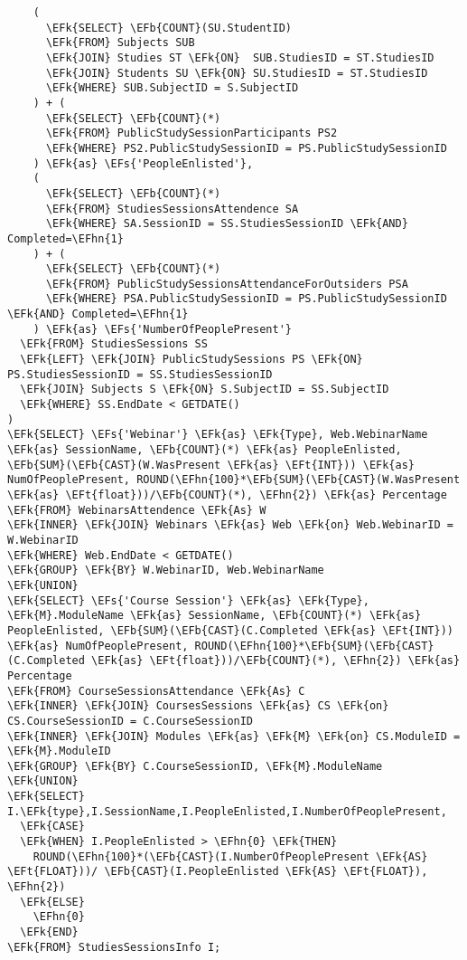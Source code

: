 \documentclass[11pt]{article}
\newcommand{\EFs}[1]{\textcolor{EFs}{#1}} %
\newcommand{\EFk}[1]{\textcolor{EFk}{\textbf{#1}}} %
\newcommand{\EFb}[1]{\textcolor{EFb}{\textbf{#1}}} %
\newcommand{\EFt}[1]{\textcolor{EFt}{\textbf{#1}}} %
\newcommand{\EFhn}[1]{\textcolor{EFhn}{#1}} %
\begin{document}
\begin{Code}
\begin{Verbatim}
    (
      \EFk{SELECT} \EFb{COUNT}(SU.StudentID)
      \EFk{FROM} Subjects SUB
      \EFk{JOIN} Studies ST \EFk{ON}  SUB.StudiesID = ST.StudiesID
      \EFk{JOIN} Students SU \EFk{ON} SU.StudiesID = ST.StudiesID
      \EFk{WHERE} SUB.SubjectID = S.SubjectID
    ) + (
      \EFk{SELECT} \EFb{COUNT}(*)
      \EFk{FROM} PublicStudySessionParticipants PS2
      \EFk{WHERE} PS2.PublicStudySessionID = PS.PublicStudySessionID
    ) \EFk{as} \EFs{'PeopleEnlisted'}, 
    (
      \EFk{SELECT} \EFb{COUNT}(*)
      \EFk{FROM} StudiesSessionsAttendence SA
      \EFk{WHERE} SA.SessionID = SS.StudiesSessionID \EFk{AND} Completed=\EFhn{1}
    ) + (
      \EFk{SELECT} \EFb{COUNT}(*)
      \EFk{FROM} PublicStudySessionsAttendanceForOutsiders PSA
      \EFk{WHERE} PSA.PublicStudySessionID = PS.PublicStudySessionID \EFk{AND} Completed=\EFhn{1}
    ) \EFk{as} \EFs{'NumberOfPeoplePresent'}
  \EFk{FROM} StudiesSessions SS 
  \EFk{LEFT} \EFk{JOIN} PublicStudySessions PS \EFk{ON} PS.StudiesSessionID = SS.StudiesSessionID
  \EFk{JOIN} Subjects S \EFk{ON} S.SubjectID = SS.SubjectID
  \EFk{WHERE} SS.EndDate < GETDATE()
)
\EFk{SELECT} \EFs{'Webinar'} \EFk{as} \EFk{Type}, Web.WebinarName \EFk{as} SessionName, \EFb{COUNT}(*) \EFk{as} PeopleEnlisted, \EFb{SUM}(\EFb{CAST}(W.WasPresent \EFk{as} \EFt{INT})) \EFk{as} NumOfPeoplePresent, ROUND(\EFhn{100}*\EFb{SUM}(\EFb{CAST}(W.WasPresent \EFk{as} \EFt{float}))/\EFb{COUNT}(*), \EFhn{2}) \EFk{as} Percentage
\EFk{FROM} WebinarsAttendence \EFk{As} W
\EFk{INNER} \EFk{JOIN} Webinars \EFk{as} Web \EFk{on} Web.WebinarID = W.WebinarID
\EFk{WHERE} Web.EndDate < GETDATE()
\EFk{GROUP} \EFk{BY} W.WebinarID, Web.WebinarName
\EFk{UNION}
\EFk{SELECT} \EFs{'Course Session'} \EFk{as} \EFk{Type}, \EFk{M}.ModuleName \EFk{as} SessionName, \EFb{COUNT}(*) \EFk{as} PeopleEnlisted, \EFb{SUM}(\EFb{CAST}(C.Completed \EFk{as} \EFt{INT})) \EFk{as} NumOfPeoplePresent, ROUND(\EFhn{100}*\EFb{SUM}(\EFb{CAST}(C.Completed \EFk{as} \EFt{float}))/\EFb{COUNT}(*), \EFhn{2}) \EFk{as} Percentage
\EFk{FROM} CourseSessionsAttendance \EFk{As} C
\EFk{INNER} \EFk{JOIN} CoursesSessions \EFk{as} CS \EFk{on} CS.CourseSessionID = C.CourseSessionID
\EFk{INNER} \EFk{JOIN} Modules \EFk{as} \EFk{M} \EFk{on} CS.ModuleID = \EFk{M}.ModuleID
\EFk{GROUP} \EFk{BY} C.CourseSessionID, \EFk{M}.ModuleName
\EFk{UNION}
\EFk{SELECT} I.\EFk{type},I.SessionName,I.PeopleEnlisted,I.NumberOfPeoplePresent,
  \EFk{CASE} 
  \EFk{WHEN} I.PeopleEnlisted > \EFhn{0} \EFk{THEN}
    ROUND(\EFhn{100}*(\EFb{CAST}(I.NumberOfPeoplePresent \EFk{AS} \EFt{FLOAT}))/ \EFb{CAST}(I.PeopleEnlisted \EFk{AS} \EFt{FLOAT}), \EFhn{2})
  \EFk{ELSE} 
    \EFhn{0}
  \EFk{END}
\EFk{FROM} StudiesSessionsInfo I;
\end{Verbatim}
\end{Code}
\end{document}

